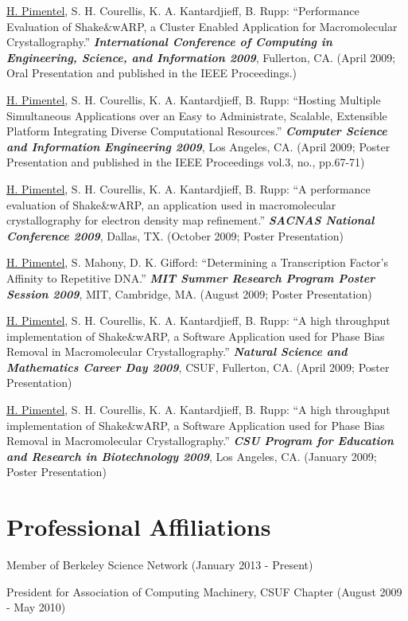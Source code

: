 \documentclass[margin,line]{res}
\begin{document}
\begin{resume}
\underline{H. Pimentel}, S. H. Courellis, K. A. Kantardjieff, B. Rupp:
``Performance Evaluation of Shake\&wARP, a Cluster Enabled Application for
Macromolecular Crystallography.'' {\bf \emph{International Conference of
    Computing in Engineering, Science, and Information
    2009}}, Fullerton, CA. (April 2009; Oral Presentation and published in the
         IEEE Proceedings.)

\underline{H. Pimentel}, S. H. Courellis, K. A. Kantardjieff, B. Rupp:
``Hosting Multiple Simultaneous Applications over an Easy to
Administrate, Scalable, Extensible Platform Integrating Diverse
Computational Resources.'' {\bf \emph{Computer Science and Information
    Engineering 2009}}, Los Angeles,
CA. (April 2009; Poster Presentation and published in the
IEEE Proceedings vol.3, no., pp.67-71)

\underline{H. Pimentel}, S. H. Courellis, K. A. Kantardjieff, B. Rupp: ``A
performance evaluation of Shake\&wARP, an application used in macromolecular
crystallography for electron density map refinement.''  {\bf \emph{SACNAS
    National Conference 2009}}, Dallas, TX. (October 2009; Poster Presentation)

\underline{H. Pimentel}, S. Mahony, D. K. Gifford: ``Determining a
Transcription Factor's Affinity to Repetitive DNA.'' {\bf \emph{MIT
    Summer Research Program Poster Session 2009}}, MIT, Cambridge,
MA. (August 2009; Poster Presentation)

\underline{H. Pimentel}, S. H. Courellis, K. A. Kantardjieff, B. Rupp: ``A high
throughput implementation of Shake\&wARP, a Software Application used for Phase
Bias Removal in Macromolecular Crystallography.'' {\bf \emph{Natural Science and
    Mathematics Career Day 2009}}, CSUF, Fullerton, CA. (April 2009; Poster
Presentation)

\underline{H. Pimentel}, S. H. Courellis, K. A. Kantardjieff, B. Rupp:
``A high throughput implementation of Shake\&wARP, a Software
Application used for Phase Bias Removal in Macromolecular
Crystallography.'' {\bf \emph{CSU Program for Education and Research
   in Biotechnology 2009}}, Los Angeles, CA. (January 2009; Poster Presentation)

\newpage

\section{\sc Professional Affiliations}
Member of Berkeley Science Network
(January 2013 - Present)

President for Association of Computing Machinery, CSUF Chapter
(August 2009 - May 2010)


\end{resume}
\end{document}
